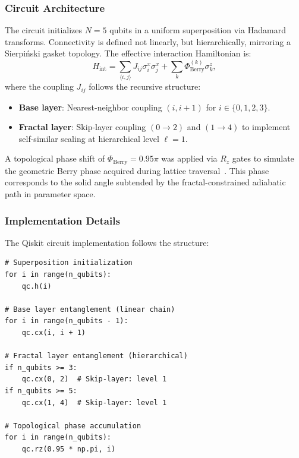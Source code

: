 \subsubsection{Circuit Architecture}

The circuit initializes $N = 5$ qubits in a uniform superposition via
Hadamard transforms. Connectivity is defined not linearly, but
hierarchically, mirroring a Sierpi\'{n}ski gasket topology. The
effective interaction Hamiltonian is:
\begin{equation}
H_{\mathrm{int}} = \sum_{\langle i,j \rangle} J_{ij} \sigma_i^x \sigma_j^x
+ \sum_{k} \Phi_{\mathrm{Berry}}^{(k)} \sigma_k^z,
\label{eq:fractal_hamiltonian}
\end{equation}
where the coupling $J_{ij}$ follows the recursive structure:

\begin{itemize}
\item \textbf{Base layer}: Nearest-neighbor coupling $(i, i+1)$ for
$i \in \{0, 1, 2, 3\}$.
\item \textbf{Fractal layer}: Skip-layer coupling $(0 \to 2)$ and
$(1 \to 4)$ to implement self-similar scaling at hierarchical level
$\ell = 1$.
\end{itemize}

A topological phase shift of $\Phi_{\mathrm{Berry}} = 0.95\pi$ was
applied via $R_z$ gates to simulate the geometric Berry phase acquired
during lattice traversal~\cite{Berry1984}. This phase corresponds to the
solid angle subtended by the fractal-constrained adiabatic path in
parameter space.

\subsubsection{Implementation Details}

The Qiskit circuit implementation follows the structure:

\begin{verbatim}
# Superposition initialization
for i in range(n_qubits):
    qc.h(i)

# Base layer entanglement (linear chain)
for i in range(n_qubits - 1):
    qc.cx(i, i + 1)

# Fractal layer entanglement (hierarchical)
if n_qubits >= 3:
    qc.cx(0, 2)  # Skip-layer: level 1
if n_qubits >= 5:
    qc.cx(1, 4)  # Skip-layer: level 1

# Topological phase accumulation
for i in range(n_qubits):
    qc.rz(0.95 * np.pi, i)
\end{verbatim}

